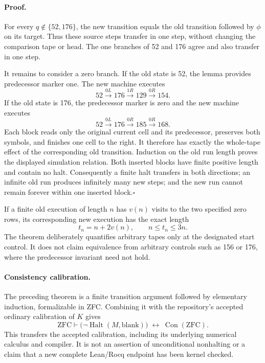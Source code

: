 \paragraph{Proof.}
For every $q\notin\{52,176\}$, the new transition equals the old transition
followed by $\phi$ on its target.  Thus these source steps transfer in one
step, without changing the comparison tape or head.  The one branches of
52 and 176 agree and also transfer in one step.

It remains to consider a zero branch.  If the old state is 52, the lemma
provides predecessor marker one.  The new machine executes
\[
 52 \xrightarrow{0L}176
 \xrightarrow{1R}129
 \xrightarrow{0R}154.
\]
If the old state is 176, the predecessor marker is zero and the new machine
executes
\[
 52 \xrightarrow{0L}176
 \xrightarrow{0R}185
 \xrightarrow{0R}168.
\]
Each block reads only the original current cell and its predecessor,
preserves both symbols, and finishes one cell to the right.  It therefore
has exactly the whole-tape effect of the corresponding old transition.
Induction on the old run length proves the displayed simulation relation.
Both inserted blocks have finite positive length and contain no halt.
Consequently a finite halt transfers in both directions; an infinite old
run produces infinitely many new steps; and the new run cannot remain
forever within one inserted block.\hfill$\square$

If a finite old execution of length $n$ has $v(n)$ visits to the two specified
zero rows, its corresponding new execution has the exact length
\[
 t_n=n+2v(n),\qquad n\le t_n\le3n.
\]
The theorem deliberately quantifies arbitrary tapes only at the designated
start control.  It does not claim equivalence from arbitrary controls such
as 156 or 176, where the predecessor invariant need not hold.

\paragraph{Consistency calibration.}
The preceding theorem is a finite transition argument followed by elementary
induction, formalizable in ZFC.  Combining it with the repository's accepted
ordinary calibration of $K$ gives
\[
 \mathrm{ZFC}\vdash
 \bigl(\neg\operatorname{Halt}(M,\mathrm{blank})\bigr)
 \;\longleftrightarrow\;\operatorname{Con}(\mathrm{ZFC}).
\]
This transfers the accepted calibration, including its underlying numerical
calculus and compiler.  It is not an assertion of unconditional nonhalting
or a claim that a new complete Lean/Rocq endpoint has been kernel checked.

